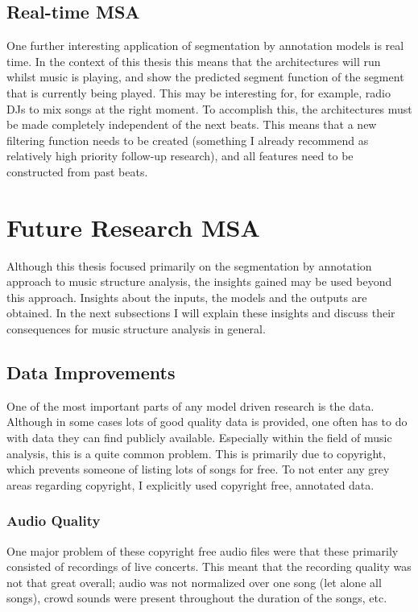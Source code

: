 \subsection{Real-time MSA}
One further interesting application of segmentation by annotation models is real time. In the context of this thesis this means that the architectures will run whilst music is playing, and show the predicted segment function of the segment that is currently being played. This may be interesting for, for example, radio DJs to mix songs at the right moment. To accomplish this, the architectures must be made completely independent of the next beats. This means that a new filtering function needs to be created (something I already recommend as relatively high priority follow-up research), and all features need to be constructed from past beats.


\section{Future Research MSA}
Although this thesis focused primarily on the segmentation by annotation approach to music structure analysis, the insights gained may be used beyond this approach. Insights about the inputs, the models and the outputs are obtained. In the next subsections I will explain these insights and discuss their consequences for music structure analysis in general.

\subsection{Data Improvements}
One of the most important parts of any model driven research is the data. Although in some cases lots of good quality data is provided, one often has to do with data they can find publicly available. Especially within the field of music analysis, this is a quite common problem. This is primarily due to copyright, which prevents someone of listing lots of songs for free. To not enter any grey areas regarding copyright, I explicitly used copyright free, annotated data.

\subsubsection{Audio Quality}
One major problem of these copyright free audio files were that these primarily consisted of recordings of live concerts. This meant that the recording quality was not that great overall; audio was not normalized over one song (let alone all songs), crowd sounds were present throughout the duration of the songs, etc. 

